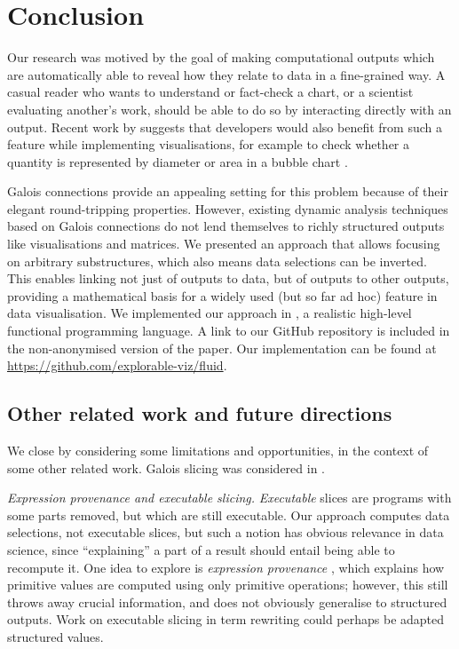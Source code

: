 \section{Conclusion}
\label{sec:conclusion}

Our research was motived by the goal of making computational outputs which are automatically able to reveal how they relate to data in a fine-grained way. A casual reader who wants to understand or fact-check a chart, or a scientist evaluating another's work, should be able to do so by interacting directly with an output. Recent work by \citeauthor{walny19} suggests that developers would also benefit from such a feature while implementing visualisations, for example to check whether a quantity is represented by diameter or area in a bubble chart \cite{walny19}.

Galois connections provide an appealing setting for this problem because of their elegant round-tripping properties. However,  existing dynamic analysis techniques based on Galois connections do not lend themselves to richly structured outputs like visualisations and matrices. We presented an approach that allows focusing on arbitrary substructures, which also means data selections can be inverted. This enables linking not just of outputs to data, but of outputs to other outputs, providing a mathematical basis for a widely used (but so far ad hoc) feature in data visualisation. We implemented our approach in \OurLanguage, a realistic high-level functional programming language. %
\ifanonymous%
   A link to our GitHub repository is included in the non-anonymised version of the paper.
\else%
   Our implementation can be found at \url{https://github.com/explorable-viz/fluid}.%
\fi%

\subsection{Other related work and future directions}
\label{sec:conclusion:other-related-work}

We close by considering some limitations and opportunities, in the context of some other related work. Galois slicing \cite{perera12a,ricciotti17,perera16d} was considered in .

\emph{Expression provenance and executable slicing.} \emph{Executable} slices \cite{hall95} are programs with some parts removed, but which are still executable. Our approach computes data selections, not executable slices, but such a notion has obvious relevance in data science, since ``explaining'' a part of a result should entail being able to recompute it. One idea to explore is \emph{expression provenance} \cite{acar12}, which explains how primitive values are computed using only primitive operations; however, this still throws away crucial information, and does not obviously generalise to structured outputs. Work on executable slicing in term rewriting \cite{field98} could perhaps be adapted structured values.

